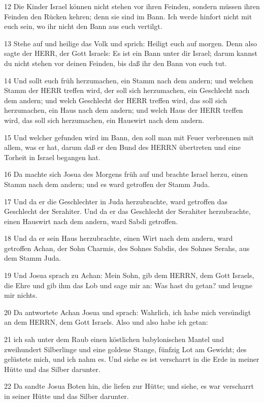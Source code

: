 \par 12 Die Kinder Israel können nicht stehen vor ihren Feinden, sondern müssen ihren Feinden den Rücken kehren; denn sie sind im Bann. Ich werde hinfort nicht mit euch sein, wo ihr nicht den Bann aus euch vertilgt.
\par 13 Stehe auf und heilige das Volk und sprich: Heiligt euch auf morgen. Denn also sagte der HERR, der Gott Israels: Es ist ein Bann unter dir Israel; darum kannst du nicht stehen vor deinen Feinden, bis daß ihr den Bann von euch tut.
\par 14 Und sollt euch früh herzumachen, ein Stamm nach dem andern; und welchen Stamm der HERR treffen wird, der soll sich herzumachen, ein Geschlecht nach dem andern; und welch Geschlecht der HERR treffen wird, das soll sich herzumachen, ein Haus nach dem andern; und welch Haus der HERR treffen wird, das soll sich herzumachen, ein Hauswirt nach dem andern.
\par 15 Und welcher gefunden wird im Bann, den soll man mit Feuer verbrennen mit allem, was er hat, darum daß er den Bund des HERRN übertreten und eine Torheit in Israel begangen hat.
\par 16 Da machte sich Josua des Morgens früh auf und brachte Israel herzu, einen Stamm nach dem andern; und es ward getroffen der Stamm Juda.
\par 17 Und da er die Geschlechter in Juda herzubrachte, ward getroffen das Geschlecht der Serahiter. Und da er das Geschlecht der Serahiter herzubrachte, einen Hauswirt nach dem andern, ward Sabdi getroffen.
\par 18 Und da er sein Haus herzubrachte, einen Wirt nach dem andern, ward getroffen Achan, der Sohn Charmis, des Sohnes Sabdis, des Sohnes Serahs, aus dem Stamm Juda.
\par 19 Und Josua sprach zu Achan: Mein Sohn, gib dem HERRN, dem Gott Israels, die Ehre und gib ihm das Lob und sage mir an: Was hast du getan? und leugne mir nichts.
\par 20 Da antwortete Achan Josua und sprach: Wahrlich, ich habe mich versündigt an dem HERRN, dem Gott Israels. Also und also habe ich getan:
\par 21 ich sah unter dem Raub einen köstlichen babylonischen Mantel und zweihundert Silberlinge und eine goldene Stange, fünfzig Lot am Gewicht; des gelüstete mich, und ich nahm es. Und siehe es ist verscharrt in die Erde in meiner Hütte und das Silber darunter.
\par 22 Da sandte Josua Boten hin, die liefen zur Hütte; und siehe, es war verscharrt in seiner Hütte und das Silber darunter.
